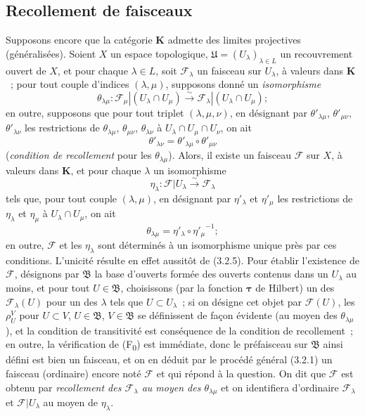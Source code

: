 \subsection{Recollement de faisceaux}
\label{subsection:0.3.3-fr}

\begin{env}[3.3.1]
\label{0.3.3.1-fr}
Supposons encore que la catégorie $\boldsymbol{K}$ admette des limites projectives
(généralisées). Soient $X$ un espace topologique,
$\mathfrak{U}=(U_\lambda)_{\lambda\in L}$ un recouvrement ouvert de $X$, et
pour chaque $\lambda\in L$, soit $\mathcal{F}_\lambda$ un faisceau sur
$U_\lambda$, à valeurs dans $\boldsymbol{K}$~; pour tout couple d'indices
$(\lambda,\mu)$, supposons donné un \emph{isomorphisme}
\[
  \theta_{\lambda\mu}:
  \mathcal{F}_\mu|(U_\lambda\cap U_\mu)
  \xrightarrow{\sim}
  \mathcal{F}_\lambda|(U_\lambda\cap U_\mu);
\]
en outre, supposons que pour tout triplet $(\lambda,\mu,\nu)$, en désignant par
$\theta'_{\lambda\mu}$, $\theta'_{\mu\nu}$, $\theta'_{\lambda\nu}$ les
restrictions de $\theta_{\lambda\mu}$, $\theta_{\mu\nu}$,
$\theta_{\lambda\nu}$ à $U_\lambda\cap U_\mu\cap U_\nu$, on ait
\[
  \theta'_{\lambda\nu}
  =\theta'_{\lambda\mu}\circ\theta'_{\mu\nu}
\]
(\emph{condition de recollement} pour les $\theta_{\lambda\mu}$). Alors, il
existe un faisceau $\mathcal{F}$ sur $X$, à valeurs dans $\boldsymbol{K}$, et pour
chaque $\lambda$ un isomorphisme
\[
  \eta_\lambda:\mathcal{F}|U_\lambda\xrightarrow{\sim}\mathcal{F}_\lambda
\]
tels que, pour tout couple $(\lambda,\mu)$, en désignant par
$\eta'_\lambda$ et $\eta'_\mu$ les restrictions de $\eta_\lambda$ et
$\eta_\mu$ à $U_\lambda\cap U_\mu$, on ait
\[
  \theta_{\lambda\mu}=\eta'_\lambda\circ{\eta'_\mu}^{-1};
\]
en outre, $\mathcal{F}$ et les $\eta_\lambda$ sont déterminés à un
isomorphisme unique près par ces conditions. L'unicité résulte en effet
aussitôt de (3.2.5). Pour établir l'existence de $\mathcal{F}$, désignons par
$\mathfrak{B}$ la base d'ouverts formée des ouverts contenus dans un
$U_\lambda$ au moins, et pour tout $U\in\mathfrak{B}$, choisissons (par la
fonction $\boldsymbol{\tau}$ de Hilbert) un des $\mathcal{F}_\lambda(U)$ pour un des
$\lambda$ tels que $U\subset U_\lambda$~; si on désigne cet objet par
$\mathcal{F}(U)$, les $\rho_U^V$ pour $U\subset V$, $U\in\mathfrak{B}$,
$V\in\mathfrak{B}$ se définissent de façon évidente (au moyen des
$\theta_{\lambda\mu}$), et la condition de transitivité est conséquence de la
condition de recollement~; en outre, la vérification de
(F\textsubscript{0}) est immédiate, donc le préfaisceau sur $\mathfrak{B}$
ainsi défini est bien un faisceau, et on en déduit par le procédé général
(3.2.1) un faisceau (ordinaire) encore noté $\mathcal{F}$ et qui répond à la
question. On dit que $\mathcal{F}$ est obtenu par \emph{recollement des
$\mathcal{F}_\lambda$ au moyen des $\theta_{\lambda\mu}$} et on identifiera
d'ordinaire $\mathcal{F}_\lambda$ et $\mathcal{F}|U_\lambda$ au moyen de
$\eta_\lambda$.


\end{env}
